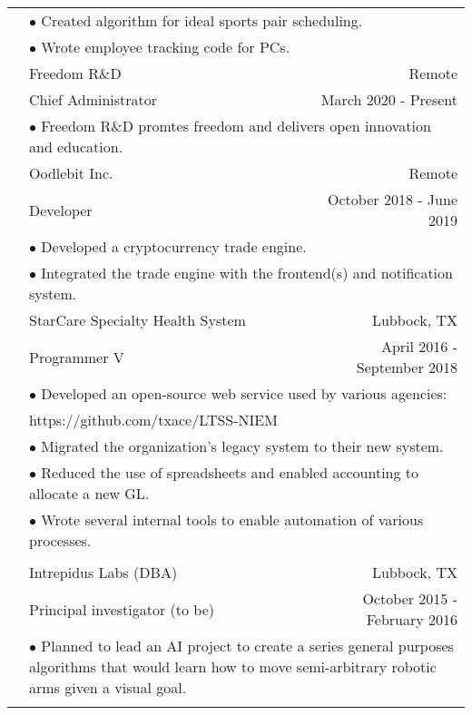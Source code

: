 \documentclass[11pt,oneside,letterpaper,titlepage,fleqn]{article}
\begin{document}
\begin{tabular}[h]{@{}p{3.25cm}@{}lr}
           & \multicolumn{2}{p{14cm}}{$\bullet$ Created algorithm for ideal sports pair scheduling. }\\
           & \multicolumn{2}{p{14cm}}{$\bullet$ Wrote employee tracking code for PCs. }\\
           & Freedom R\&D & Remote\\
           & Chief Administrator & March 2020 - Present\\
           & \multicolumn{2}{p{14cm}}{$\bullet$ Freedom R\&D promtes freedom and delivers open innovation and education.}\\        
           & Oodlebit Inc. & Remote\\
           & Developer & October 2018 - June 2019\\
           & \multicolumn{2}{p{14cm}}{$\bullet$ Developed a cryptocurrency trade engine.}\\
           & \multicolumn{2}{p{14cm}}{$\bullet$ Integrated the trade engine with the frontend(s) and notification system.}\\           
           & StarCare Specialty Health System & Lubbock, TX\\
           & Programmer V & April 2016 - September 2018\\
           & \multicolumn{2}{p{14cm}}{$\bullet$ Developed an open-source web service used by various agencies:}\\
					& https://github.com/txace/LTSS-NIEM\\
           & \multicolumn{2}{p{14cm}}{$\bullet$ Migrated the organization's legacy system to their new system.}\\           
           & \multicolumn{2}{p{14cm}}{$\bullet$ Reduced the use of spreadsheets and enabled accounting to allocate a new GL.}\\   					
           & \multicolumn{2}{p{14cm}}{$\bullet$ Wrote several internal tools to enable automation of various processes.}\\ 					
\\
&  Intrepidus Labs (DBA) & Lubbock, TX\\
           & Principal investigator (to be) & October 2015 - February 2016\\
           & \multicolumn{2}{p{14cm}}{$\bullet$ Planned to lead an AI project to create a series general purposes algorithms that would learn how to move semi-arbitrary robotic arms given a visual goal.} \\        
\\                    

\end{tabular}
\end{document}
